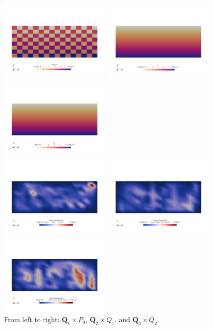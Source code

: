 \begin{center}
\includegraphics[width=5.4cm]{python_codes/fieldstone_42/results/geom0/press1}
\includegraphics[width=5.4cm]{python_codes/fieldstone_42/results/geom0/press2}
\includegraphics[width=5.4cm]{python_codes/fieldstone_42/results/geom0/press3}\\
\includegraphics[width=5.4cm]{python_codes/fieldstone_42/results/geom0/vel1}
\includegraphics[width=5.4cm]{python_codes/fieldstone_42/results/geom0/vel2}
\includegraphics[width=5.4cm]{python_codes/fieldstone_42/results/geom0/vel3}\\
{\captionfont From left to right: ${\bm Q}_1\times P_0$, ${\bm Q}_2\times Q_1$, 
and ${\bm Q}_3\times Q_2$.}
\end{center}



